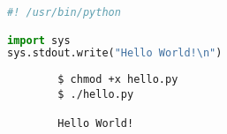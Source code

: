 \documentclass{article}
\begin{document}
\begin{file}[hello.py]
\begin{lstlisting}[language=Python]
#! /usr/bin/python

import sys
sys.stdout.write("Hello World!\n")
\end{lstlisting}
\end{file}

\begin{commandline}
	\begin{verbatim}
		$ chmod +x hello.py
		$ ./hello.py

		Hello World!
	\end{verbatim}
\end{commandline}
\end{document}
